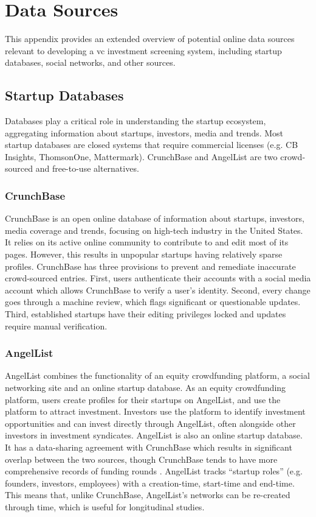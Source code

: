 \chapter{Data Sources}
\label{appendix:data_sources}

This appendix provides an extended overview of potential online data sources relevant to developing a \gls{vc} investment screening system, including startup databases, social networks, and other sources.

\section{Startup Databases}

Databases play a critical role in understanding the startup ecosystem, aggregating information about startups, investors, media and trends. Most startup databases are closed systems that require commercial licenses (e.g. CB Insights, ThomsonOne, Mattermark). CrunchBase and AngelList are two crowd-sourced and free-to-use alternatives.

\subsection{CrunchBase}

CrunchBase is an open online database of information about startups, investors, media coverage and trends, focusing on high-tech industry in the United States. It relies on its active online community to contribute to and edit most of its pages. However, this results in unpopular startups having relatively sparse profiles. CrunchBase has three provisions to prevent and remediate inaccurate crowd-sourced entries. First, users authenticate their accounts with a social media account which allows CrunchBase to verify a user's identity. Second, every change goes through a machine review, which flags significant or questionable updates. Third, established startups have their editing privileges locked and updates require manual verification.

\subsection{AngelList}

AngelList combines the functionality of an equity crowdfunding platform, a social networking site and an online startup database. As an equity crowdfunding platform, users create profiles for their startups on AngelList, and use the platform to attract investment. Investors use the platform to identify investment opportunities and can invest directly through AngelList, often alongside other investors in investment syndicates. AngelList is also an online startup database. It has a data-sharing agreement with CrunchBase which results in significant overlap between the two sources, though CrunchBase tends to have more comprehensive records of funding rounds \cite{cheng2016}. AngelList tracks ``startup roles'' (e.g. founders, investors, employees) with a creation-time, start-time and end-time. This means that, unlike CrunchBase, AngelList's networks can be re-created through time, which is useful for longitudinal studies.

